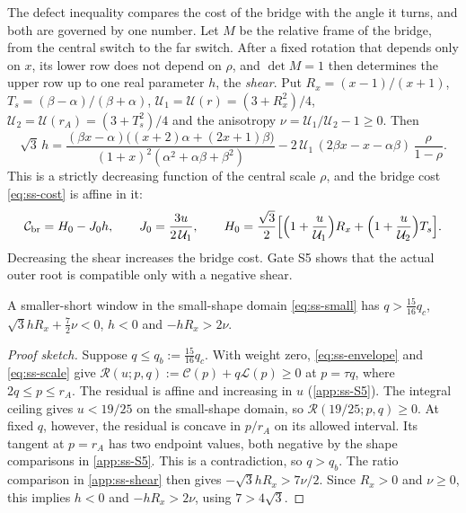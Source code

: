 The defect inequality compares the cost of the bridge with the angle it turns, and both are
governed by one number. Let $M$ be the relative frame of the bridge, from the central switch to
the far switch. After a fixed rotation that depends only on $x$, its lower row does not depend on
$\rho$, and $\det M=1$ then determines the upper row up to one real parameter $h$, the
\emph{shear}. Put $R_x=(x-1)/(x+1)$, $T_s=(\beta-\alpha)/(\beta+\alpha)$,
$\mathcal U_1=\mathcal U(r)=(3+R_x^2)/4$, $\mathcal U_2=\mathcal U(r_A)=(3+T_s^2)/4$ and the
anisotropy $\nu=\mathcal U_1/\mathcal U_2-1\ge0$. Then
\begin{equation}\label{eq:ss-shear}
  \sqrt3\,h=\frac{(\beta x-\alpha)\bigl((x+2)\alpha+(2x+1)\beta\bigr)}
  {(1+x)^2(\alpha^2+\alpha\beta+\beta^2)}
  -2\,\mathcal U_1\,(2\beta x-x-\alpha\beta)\,\frac{\rho}{1-\rho}
.
\end{equation}
This is a strictly decreasing function of the central scale $\rho$, and the
bridge cost \eqref{eq:ss-cost} is affine in it:
\begin{equation}\label{eq:ss-cost-shear}
  \mathcal{C}_{\mathrm{br}}=H_0-J_0h,\qquad J_0=\frac{3u}{2\,\mathcal U_1},\qquad
  H_0=\frac{\sqrt3}{2}\Bigl[\Bigl(1+\frac{u}{\mathcal U_1}\Bigr)R_x
   +\Bigl(1+\frac{u}{\mathcal U_2}\Bigr)T_s\Bigr].
\end{equation}
Decreasing the shear increases the bridge cost. Gate S5 shows that the actual outer root is
compatible only with a negative shear.

\begin{proposition}[Gate S5]\label{prop:ss-S5}
A smaller-short window in the small-shape domain \eqref{eq:ss-small} has
$q>\frac{15}{16}q_c$, $\sqrt3hR_x+\frac72\nu<0$, $h<0$ and $-hR_x>2\nu$.
\end{proposition}

\begin{proof}[Proof sketch]
Suppose $q\le q_b:=\frac{15}{16}q_c$. With weight zero, \eqref{eq:ss-envelope} and
\eqref{eq:ss-scale} give $\mathcal R(u;p,q):=\mathcal C(p)+q\mathcal L(p)\ge0$ at $p=\tau q$,
where $2q\le p\le r_A$. The residual is affine and increasing in $u$
(\cref{app:ss-S5}). The integral ceiling gives $u<19/25$ on the small-shape domain, so
$\mathcal R(19/25;p,q)\ge0$. At fixed $q$, however, the residual is concave in $p/r_A$ on its
allowed interval. Its tangent at $p=r_A$ has two endpoint values, both negative by the
shape comparisons in \cref{app:ss-S5}. This is a contradiction, so $q>q_b$.
The ratio comparison in \cref{app:ss-shear} then gives $-\sqrt3hR_x>7\nu/2$.
Since $R_x>0$ and $\nu\ge0$, this implies $h<0$ and $-hR_x>2\nu$, using $7>4\sqrt3$.
\end{proof}


